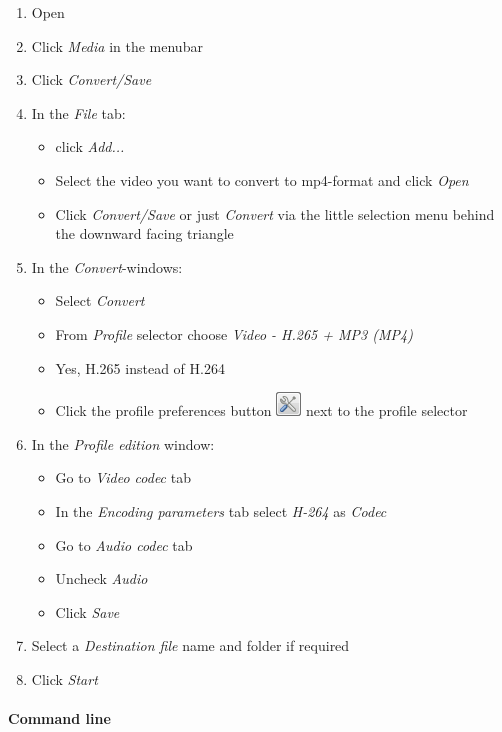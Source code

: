 \begin{enumerate}[noitemsep]
  \item Open\marktool{\vlcname}
  \item Click \textit{Media} in the menubar
  \item Click \textit{Convert/Save}
  \item In the \textit{File} tab:
  \begin{itemize}[noitemsep]
    \item click \textit{Add...}
    \item Select the video you want to convert to mp4-format and click \textit{Open}
    \item Click \textit{Convert/Save} or just \textit{Convert} via the little selection menu behind the downward facing triangle
  \end{itemize}
  \item In the \textit{Convert}-windows:
  \begin{itemize}[noitemsep]
    \item Select \textit{Convert}
    \item From \textit{Profile} selector choose \textit{Video - H.265 + MP3 (MP4)}
    \item Yes, H.265 instead of H.264
    \item Click the profile preferences button \includegraphics[width=\iconsize]{Figures/Icons/VLC_Preferences} next to the profile selector
  \end{itemize}
  \item In the \textit{Profile edition} window:
  \begin{itemize}
    \item Go to \textit{Video codec} tab
    \item In the \textit{Encoding parameters} tab select \textit{H-264} as \textit{Codec}
    \item Go to \textit{Audio codec} tab
    \item Uncheck \textit{Audio}
    \item Click \textit{Save}
  \end{itemize}
  \item Select a \textit{Destination file} name and folder if required
  \item Click \textit{Start}
\end{enumerate}

\paragraph{Command line}

